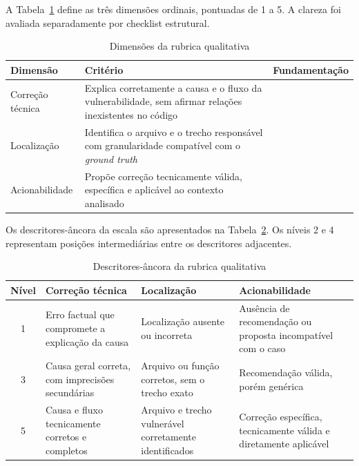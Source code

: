 A Tabela~\ref{tab:dimensoes-rubrica} define as três dimensões ordinais, pontuadas de 1 a 5. A clareza foi avaliada separadamente por checklist estrutural.

\begin{table}[htb]
\ABNTEXfontereduzida
\caption{\label{tab:dimensoes-rubrica}Dimensões da rubrica qualitativa}
\centering
\begin{tabularx}{\textwidth}{|l|X|X|}
\hline
\textbf{Dimensão} & \textbf{Critério} & \textbf{Fundamentação} \\
\hline
Correção técnica & Explica corretamente a causa e o fluxo da vulnerabilidade, sem afirmar relações inexistentes no código & \cite{Mao2025ExplainableVD} \\
\hline
Localização & Identifica o arquivo e o trecho responsável com granularidade compatível com o \textit{ground truth} & \cite{Zhang2023LocateDescribe, Mao2025ExplainableVD} \\
\hline
Acionabilidade & Propõe correção tecnicamente válida, específica e aplicável ao contexto analisado & \cite{Mao2025ExplainableVD, Aloraini2019SASTWarnings} \\
\hline
\end{tabularx}
\end{table}

Os descritores-âncora da escala são apresentados na Tabela~\ref{tab:ancoras-rubrica}. Os níveis 2 e 4 representam posições intermediárias entre os descritores adjacentes.

\begin{table}[htb]
\ABNTEXfontereduzida
\caption{\label{tab:ancoras-rubrica}Descritores-âncora da rubrica qualitativa}
\centering
\begin{tabularx}{\textwidth}{|c|X|X|X|}
\hline
\textbf{Nível} & \textbf{Correção técnica} & \textbf{Localização} & \textbf{Acionabilidade} \\
\hline
1 & Erro factual que compromete a explicação da causa & Localização ausente ou incorreta & Ausência de recomendação ou proposta incompatível com o caso \\
\hline
3 & Causa geral correta, com imprecisões secundárias & Arquivo ou função corretos, sem o trecho exato & Recomendação válida, porém genérica \\
\hline
5 & Causa e fluxo tecnicamente corretos e completos & Arquivo e trecho vulnerável corretamente identificados & Correção específica, tecnicamente válida e diretamente aplicável \\
\hline
\end{tabularx}
\end{table}

